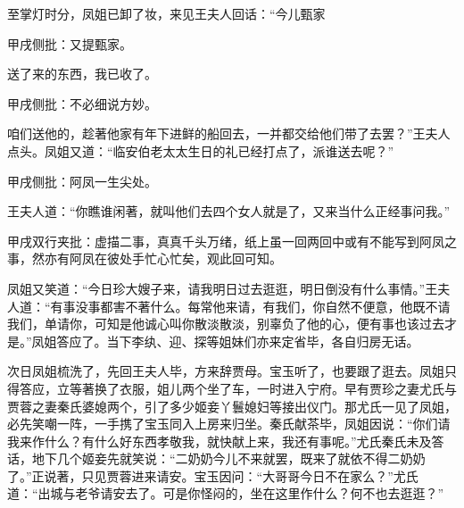 \begin{parag}
    至掌灯时分，凤姐已卸了妆，来见王夫人回话：“今儿甄家\begin{note}甲戌侧批：又提甄家。\end{note}送了来的东西，我已收了。\begin{note}甲戌侧批：不必细说方妙。\end{note}咱们送他的，趁著他家有年下进鲜的船回去，一并都交给他们带了去罢？”王夫人点头。凤姐又道：“临安伯老太太生日的礼已经打点了，派谁送去呢？”\begin{note}甲戌侧批：阿凤一生尖处。\end{note}王夫人道：“你瞧谁闲著，就叫他们去四个女人就是了，又来当什么正经事问我。”\begin{note}甲戌双行夹批：虚描二事，真真千头万绪，纸上虽一回两回中或有不能写到阿凤之事，然亦有阿凤在彼处手忙心忙矣，观此回可知。\end{note}凤姐又笑道：“今日珍大嫂子来，请我明日过去逛逛，明日倒没有什么事情。”王夫人道：“有事没事都害不著什么。每常他来请，有我们，你自然不便意，他既不请我们，单请你，可知是他诚心叫你散淡散淡，别辜负了他的心，便有事也该过去才是。”凤姐答应了。当下李纨、迎、探等姐妹们亦来定省毕，各自归房无话。
\end{parag}


\begin{parag}
    次日凤姐梳洗了，先回王夫人毕，方来辞贾母。宝玉听了，也要跟了逛去。凤姐只得答应，立等著换了衣服，姐儿两个坐了车，一时进入宁府。早有贾珍之妻尤氏与贾蓉之妻秦氏婆媳两个，引了多少姬妾丫鬟媳妇等接出仪门。那尤氏一见了凤姐，必先笑嘲一阵，一手携了宝玉同入上房来归坐。秦氏献茶毕，凤姐因说：“你们请我来作什么？有什么好东西孝敬我，就快献上来，我还有事呢。”尤氏秦氏未及答话，地下几个姬妾先就笑说：“二奶奶今儿不来就罢，既来了就依不得二奶奶了。”正说著，只见贾蓉进来请安。宝玉因问：“大哥哥今日不在家么？”尤氏道：“出城与老爷请安去了。可是你怪闷的，坐在这里作什么？何不也去逛逛？”
\end{parag}


